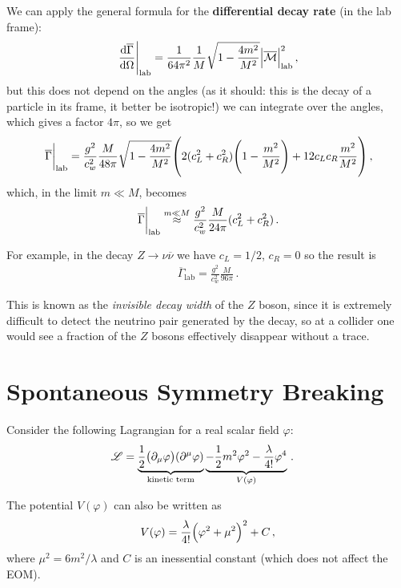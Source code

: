 \documentclass[main.tex]{subfiles}
\begin{document}
We can apply the general formula for the \textbf{differential decay rate} (in the lab frame): 
%
\begin{align}
\eval{\dv{\overline{\Gamma} }{\Omega }}_{\text{lab}}
= \frac{1}{64 \pi^2} \frac{1}{M} 
\sqrt{1- \frac{4m^2}{M^2}} \abs{\mathcal{\overline{M}}}^2_{\text{lab}}
\,,
\end{align}
%
but this does not depend on the angles (as it should: this is the decay of a particle in its frame, it better be isotropic!) we can integrate over the angles, which gives a factor \(4 \pi \), so we get 
%
\begin{align}
\eval{\overline{\Gamma}}_{\text{lab}}=
\frac{g^2}{c_w^2}
\frac{M}{48 \pi } \sqrt{1 - \frac{4m^2}{M^2}}
\qty(2 (c_L^2 + c_R^2) \qty(1 - \frac{m^2}{M^2}) + 12 c_L c_R \frac{m^2}{M^2})
\,,
\end{align}
%
which, in the limit \(m \ll M\), becomes  
%
\begin{align}
\eval{\overline{\Gamma}}_{\text{lab}}
\overset{m \ll M}{\approx}
\frac{g^2}{c_w^2}
\frac{M}{24 \pi }
(c_L^2 + c_R^2)
\,.
\end{align}

For example, in the decay \(Z \to \nu \overline{\nu}\) we have \(c_L = 1/2\), \(c_R = 0\) so the result is 
%
\begin{align}
\overline{\Gamma}_{\text{lab}}
= \frac{g^2}{c_w^2} \frac{M}{96 \pi }
\,.
\end{align}

This is known as the \emph{invisible decay width} of the \(Z\) boson, since it is extremely difficult to detect the neutrino pair generated by the decay, so at a collider one would see a fraction of the \(Z\) bosons effectively disappear without a trace.

\section{Spontaneous Symmetry Breaking}

Consider the following Lagrangian for a real scalar field \(\varphi \): 
%
\begin{align}
\mathscr{L} &= \underbrace{\frac{1}{2} \qty( \partial_{\mu } \varphi ) \qty(\partial^{\mu } \varphi )}_{\text{kinetic term}}
\underbrace{- \frac{1}{2} m^2 \varphi^2 - \frac{\lambda}{4!} \varphi^{4} }_{V(\varphi )}
\,.
\end{align}

The potential \(V(\varphi )\) can also be written as 
%
\begin{align}
V(\varphi ) = \frac{\lambda}{4!} \qty(\varphi^2 + \mu^2)^2 + C
\,,
\end{align}
%
where \(\mu^2 = 6 m^2 / \lambda \) and \(C\) is an inessential constant (which does not affect the EOM). 
\end{document}
